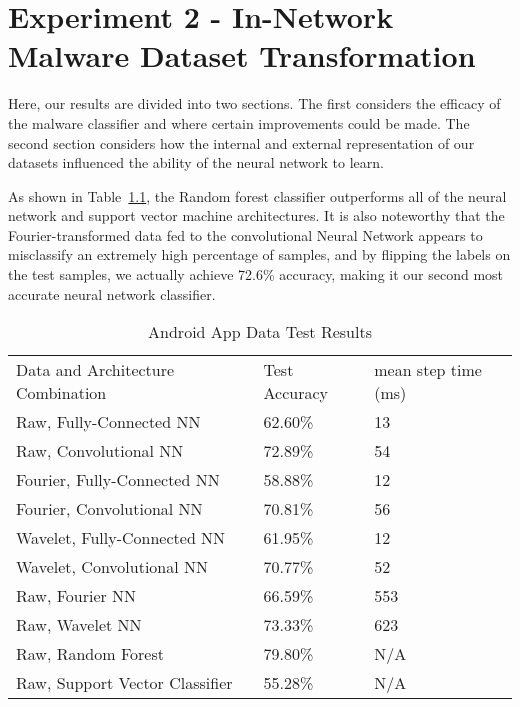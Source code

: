 \chapter{Experiment 2 - In-Network Malware Dataset Transformation}
\label{chap:four}

Here, our results are divided into two sections. 
The first considers the efficacy of the malware classifier and where certain improvements could be made.
The second section considers how the internal and external representation of our datasets influenced the ability of the neural network to learn.

 \label{malware classifier}
As shown in Table~\ref{Tab:test}, the Random forest classifier outperforms all of the neural network and support vector machine architectures.
It is also noteworthy that the Fourier-transformed data fed to the convolutional Neural Network appears to misclassify an extremely high percentage of samples, and by flipping the labels on the test samples, we actually achieve 72.6\% accuracy, making it our second most accurate neural network classifier.

 
\begin{table}[ht]
\caption{Android App Data Test Results}
\centering
\label{Tab:test}	
\begin{tabular}{lll}
Data and Architecture Combination & Test Accuracy & mean step time (ms) \\
Raw, Fully-Connected NN           & 62.60\%         & 13                  \\
Raw, Convolutional NN             & 72.89\%         & 54                  \\
Fourier, Fully-Connected NN       & 58.88\%         & 12                  \\
Fourier, Convolutional NN         & 70.81\%         & 56                  \\
Wavelet, Fully-Connected NN       & 61.95\%         & 12                  \\
Wavelet, Convolutional NN         & 70.77\%         & 52                  \\
Raw, Fourier NN                   & 66.59\%         & 553                 \\
Raw, Wavelet NN                   & 73.33\%         & 623                \\
Raw, Random Forest                & 79.80\%         & N/A                 \\
Raw, Support Vector Classifier    & 55.28\%         & N/A                
\end{tabular}
\end{table}
 

